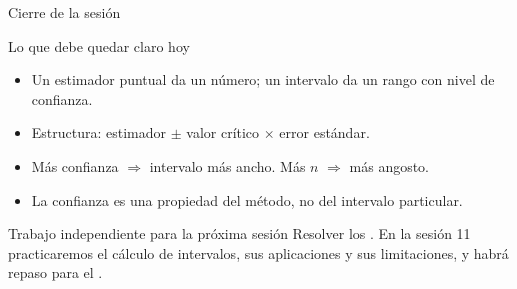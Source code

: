 \documentclass[aspectratio=169,10pt]{beamer}
\begin{document}
\begin{frame}{Cierre de la sesión}
  \begin{block}{Lo que debe quedar claro hoy}
    \begin{itemize}
      \item Un estimador puntual da un número; un intervalo da un rango con
            nivel de confianza.
      \item Estructura: estimador $\pm$ valor crítico $\times$ error estándar.
      \item Más confianza $\Rightarrow$ intervalo más ancho. Más $n$
            $\Rightarrow$ más angosto.
      \item La confianza es una propiedad del método, no del intervalo
            particular.
    \end{itemize}
  \end{block}

  \vspace{0.2cm}
  \begin{alertblock}{Trabajo independiente para la próxima sesión}
    \footnotesize
    Resolver los . En la sesión
    11 practicaremos el cálculo de intervalos, sus aplicaciones y sus
    limitaciones, y habrá repaso para el .
  \end{alertblock}
\end{frame}
\end{document}

